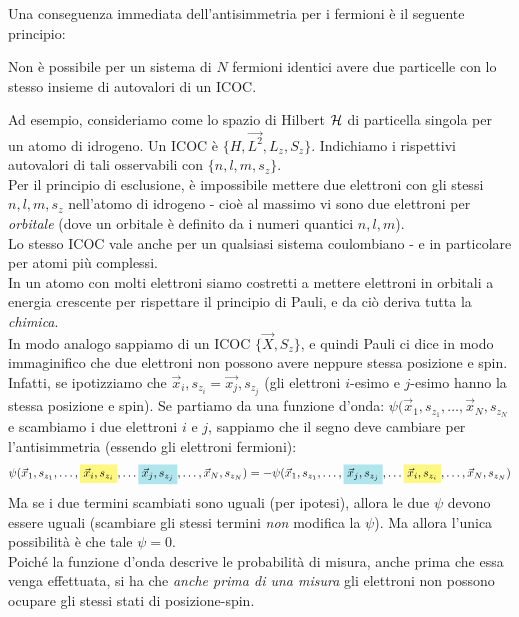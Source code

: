 \documentclass[../../FisicaTeorica.tex]{subfiles}
\begin{document}
Una conseguenza immediata dell'antisimmetria per i fermioni è il seguente principio:
\begin{thm}
Non è possibile per un sistema di $N$ fermioni identici avere due particelle con lo stesso insieme di autovalori di un ICOC.
\end{thm}
Ad esempio, consideriamo come lo spazio di Hilbert $\mathcal{H}$ di particella singola per un atomo di idrogeno. Un ICOC è $\{H, \vec{L^2}, L_z, S_z\}$. Indichiamo i rispettivi autovalori di tali osservabili con $\{n, l, m, s_z\}$.\\
Per il principio di esclusione, è impossibile mettere due elettroni con gli stessi $n, l, m, s_z$ nell'atomo di idrogeno - cioè al massimo vi sono due elettroni per \textit{orbitale} (dove un orbitale è definito da i numeri quantici $n,l,m$).\\
Lo stesso ICOC vale anche per un qualsiasi sistema coulombiano - e in particolare per atomi più complessi.\\
In un atomo con molti elettroni siamo costretti a mettere elettroni in orbitali a energia crescente per rispettare il principio di Pauli, e da ciò deriva tutta la \textit{chimica}.\\
In modo analogo sappiamo di un ICOC $\{\vec{X}, S_z\}$, e quindi Pauli ci dice in modo immaginifico che due elettroni non possono avere neppure  stessa posizione e spin. Infatti, se ipotizziamo che $\vec{x}_i, s_{z_i} = \vec{x_j}, s_{z_j}$ (gli elettroni $i$-esimo e $j$-esimo hanno la stessa posizione e spin). Se partiamo da una funzione d'onda:
$\psi(\vec{x}_1, s_{z_1}, \dots, \vec{x}_N, s_{z_N}$
e scambiamo i due elettroni $i$ e $j$, sappiamo che il segno deve cambiare per l'antisimmetria (essendo gli elettroni fermioni):
\begin{align*}
\psi(\vec{x}_1, s_{z_1}, \dots, \hlc{Yellow}{\vec{x}_i, s_{z_i}}, \dots \hlc{SkyBlue}{\vec{x}_j, s_{z_j}}, \dots, \vec{x}_N, s_{z_N})=-
\psi(\vec{x}_1, s_{z_1}, \dots, \hlc{SkyBlue}{\vec{x}_j, s_{z_j}}, \dots \hlc{Yellow}{\vec{x}_i, s_{z_i}}, \dots, \vec{x}_N, s_{z_N})
\end{align*}
Ma se i due termini scambiati sono uguali (per ipotesi), allora le due $\psi$ devono essere uguali (scambiare gli stessi termini \textit{non} modifica la $\psi$). Ma allora l'unica possibilità è che tale $\psi=0$.\\


Poiché la funzione d'onda descrive le probabilità di misura, anche prima che essa venga effettuata, si ha che \textit{anche prima di una misura} gli elettroni non possono ocupare gli stessi stati di posizione-spin.\\
\end{document}
